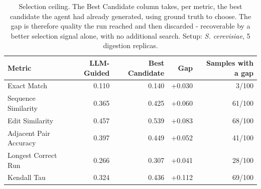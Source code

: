 \begin{table}[!tb]
  \centering
  \caption{Selection ceiling. The Best Candidate column takes, per metric, the best candidate the agent had already generated, using ground truth to choose. The gap is therefore quality the run reached and then discarded - recoverable by a better selection signal alone, with no additional search. Setup: \textnormal{\textnormal{\textit{S. cerevisiae}}}, 5 digestion replicas.}
  \label{tab:selection_ceiling_yeast_r5}
  \begin{tabular}{lrrrr}
    \toprule
    Metric & LLM-Guided & Best Candidate & Gap & Samples with a gap \\
    \midrule
    Exact Match & 0.110 & 0.140 & +0.030 & 3/100 \\
    Sequence Similarity & 0.365 & 0.425 & +0.060 & 61/100 \\
    Edit Similarity & 0.457 & 0.539 & +0.083 & 68/100 \\
    Adjacent Pair Accuracy & 0.397 & 0.449 & +0.052 & 41/100 \\
    Longest Correct Run & 0.266 & 0.307 & +0.041 & 28/100 \\
    Kendall Tau & 0.324 & 0.436 & +0.112 & 69/100 \\
    \bottomrule
  \end{tabular}
\end{table}
